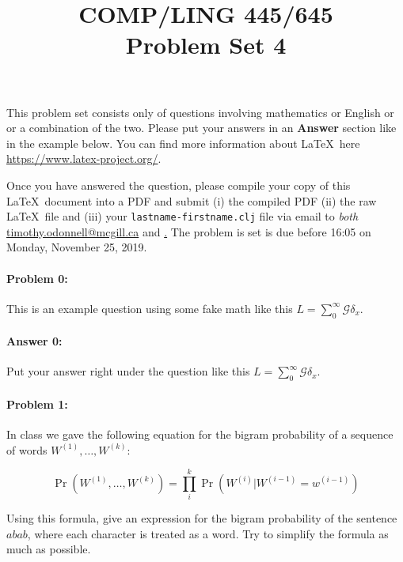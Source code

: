 \documentclass[10pt]{article}
\begin{document}
 
\title{COMP/LING 445/645\\Problem Set 4}
\date{}
\maketitle

This problem set consists only of questions involving mathematics or
English or or a combination of the two. Please put your answers in an
\textbf{Answer} section like in the example below. You can find more
information about \LaTeX\ here \url{https://www.latex-project.org/}.

Once you have answered the question, please compile your copy of this
\LaTeX\ document into a PDF and submit (i) the compiled PDF (ii) the
raw \LaTeX\ file and (iii) your \texttt{lastname-firstname.clj} file
via email to \emph{both}
\href{mailto:timothy.odonnell@mcgill.ca}{timothy.odonnell@mcgill.ca}
and
\href{mailto:savanna.willerton@mail.mcgill.ca}\href{savanna.willerton@mail.mcgill.ca}.
The problem is set is due before 16:05 on Monday, November 25, 2019.


\hrulefill
\paragraph{Problem 0:}
This is an example question using some fake math like this
$L=\sum_0^{\infty} \mathcal{G} \delta_x$.

\paragraph{Answer 0:} Put your answer right under the question like
this $L=\sum_0^{\infty} \mathcal{G} \delta_x$.

\hrulefill
\paragraph{Problem 1:}
 
In class we gave the following equation for the bigram probability of
a sequence of words $W^{(1)},\dots,W^{(k)}$:

\begin{equation}\label{eq:bigram}
\Pr(W^{(1)},\dots,W^{(k)})=\prod_i^k \Pr(W^{(i)} | W^{(i-1)}=w^{(i-1)})
\end{equation}

\noindent Using this formula, give an expression for the bigram
probability of the sentence $abab$, where each character is treated as
a word. Try to simplify the formula as much as possible.
\end{document}
